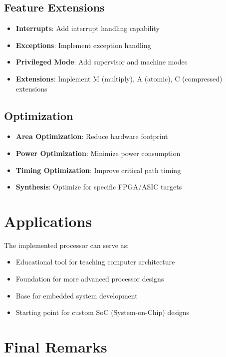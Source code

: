 \subsection{Feature Extensions}

\begin{itemize}
    \item \textbf{Interrupts}: Add interrupt handling capability
    \item \textbf{Exceptions}: Implement exception handling
    \item \textbf{Privileged Mode}: Add supervisor and machine modes
    \item \textbf{Extensions}: Implement M (multiply), A (atomic), C (compressed) extensions
\end{itemize}

\subsection{Optimization}

\begin{itemize}
    \item \textbf{Area Optimization}: Reduce hardware footprint
    \item \textbf{Power Optimization}: Minimize power consumption
    \item \textbf{Timing Optimization}: Improve critical path timing
    \item \textbf{Synthesis}: Optimize for specific FPGA/ASIC targets
\end{itemize}

\section{Applications}

The implemented processor can serve as:

\begin{itemize}
    \item Educational tool for teaching computer architecture
    \item Foundation for more advanced processor designs
    \item Base for embedded system development
    \item Starting point for custom SoC (System-on-Chip) designs
\end{itemize}

\section{Final Remarks}

